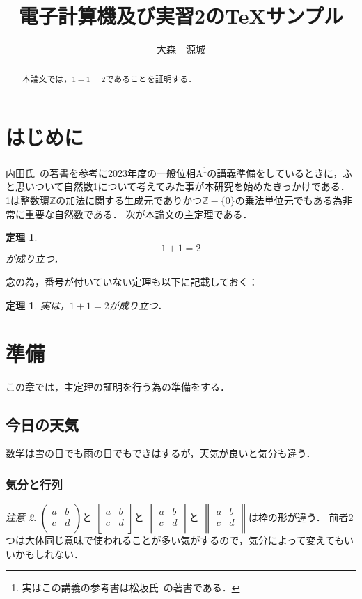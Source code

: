 \documentclass{amsart}
\title{電子計算機及び実習2のTeXサンプル}
\author{大森　源城}
\theoremstyle{plain}%
\newtheorem{thm}{定理}
\newtheorem*{thm*}{定理}%
\theoremstyle{definition}%
\theoremstyle{remark}%
\newtheorem{rem}{注意}
\theoremstyle{definition}%
\theoremstyle{remark}%
\newtheorem{rem}[thm]{注意}
\newcommand{\Z}{\mathbb{Z}}
\begin{document}
\maketitle

\begin{abstract}
本論文では，$1+1=2$であることを証明する．
\end{abstract}

\section{はじめに}

内田氏~\cite{Uchida}の著書を参考に2023年度の一般位相A\footnote{実はこの講義の参考書は松坂氏~\cite{Matsuzaka}の著書である．}の講義準備をしているときに，ふと思いついて自然数1について考えてみた事が本研究を始めたきっかけである．
1は整数環$\Z $の加法に関する生成元でありかつ$\Z -\{0\}$の乗法単位元でもある為非常に重要な自然数である．
次が本論文の主定理である．
\begin{thm}\label{main-thm}
\[
1+1=2
\]
が成り立つ．
\end{thm}
念の為，番号が付いていない定理も以下に記載しておく：
\begin{thm*}
実は，$1+1=2$が成り立つ．
\end{thm*}


\section{準備}

この章では，主定理の証明を行う為の準備をする．

\subsection{今日の天気}

数学は雪の日でも雨の日でもできはするが，天気が良いと気分も違う．

\subsubsection{気分と行列}

\begin{rem}
$\begin{pmatrix}
a & b \\
c & d \\
\end{pmatrix}
$と
$\begin{bmatrix}
a & b \\
c & d \\
\end{bmatrix}
$と
$\begin{vmatrix}
a & b \\
c & d \\
\end{vmatrix}
$と
$\begin{Vmatrix}
a & b \\
c & d \\
\end{Vmatrix}
$は枠の形が違う．
前者2つは大体同じ意味で使われることが多い気がするので，気分によって変えてもいいかもしれない．
\end{rem}
\end{document}
